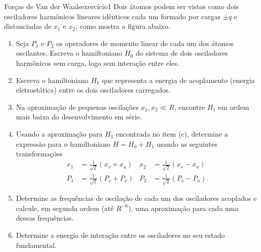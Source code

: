 \begin{exercício}{Forças de Van der Waals}{exercício1}
    Dois átomos podem ser vistos como dois osciladores harmônicos lineares idênticos cada um formado por cargas \(\pm q\) e distanciadas de \(x_1\) e \(x_2\), como mostra a figura abaixo.
    \begin{center}
    \end{center}
    \begin{enumerate}[label=(\alph*)]
        \item Seja \(P_1\) e \(P_2\) os operadores de momento linear de cada um dos átomos oscilantes. Escreva o hamiltoniano \(H_0\) do sistema de dois osciladores harmônicos sem carga, logo sem interação entre eles.
        \item Escreva o hamiltoniano \(H_1\) que representa a energia de acoplamento (energia eletrostática) entre os dois osciladores carregados.
        \item Na aproximação de pequenas oscilações \(x_1, x_2 \ll R\), encontre \(H_1\) em ordem mais baixa do desenvolvimento em série.
        \item Usando a aproximação para \(H_1\) encontrada no item (c), determine a expressão para o hamiltoniano \(H = H_0 + H_1\) usando as seguintes transformações
            \begin{align*}
                x_1 &= \frac{1}{\sqrt{2}} (x_s + x_a) &
                x_2 &= \frac{1}{\sqrt{2}} (x_s - x_a)\\
                P_1 &= \frac{1}{\sqrt{2}} (P_s + P_a) &
                P_2 &= \frac{1}{\sqrt{2}} (P_s - P_a).
            \end{align*}
        \item Determine as frequências de oscilação de cada um dos osciladores acoplados e calcule, em segunda ordem (até \(R^{-6}\)), uma aproximação para cada uma dessas frequências.
        \item Determine a energia de interação entre os osciladores no seu estado fundamental.
    \end{enumerate}
\end{exercício}
